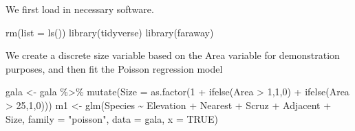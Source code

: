 \documentclass[
  ignorenonframetext,
]{beamer}
\newenvironment{Shaded}{\begin{snugshade}}{\end{snugshade}}
\newcommand{\AttributeTok}[1]{\textcolor[rgb]{0.77,0.63,0.00}{#1}}
\newcommand{\ConstantTok}[1]{\textcolor[rgb]{0.00,0.00,0.00}{#1}}
\newcommand{\DecValTok}[1]{\textcolor[rgb]{0.00,0.00,0.81}{#1}}
\newcommand{\FunctionTok}[1]{\textcolor[rgb]{0.00,0.00,0.00}{#1}}
\newcommand{\NormalTok}[1]{#1}
\newcommand{\OtherTok}[1]{\textcolor[rgb]{0.56,0.35,0.01}{#1}}
\newcommand{\SpecialCharTok}[1]{\textcolor[rgb]{0.00,0.00,0.00}{#1}}
\newcommand{\StringTok}[1]{\textcolor[rgb]{0.31,0.60,0.02}{#1}}
\begin{document}
\begin{frame}[fragile]{}
\protect\hypertarget{section-3}{}
We first load in necessary software.

\vspace{12pt}
\small

\begin{Shaded}
\begin{Highlighting}[]
\FunctionTok{rm}\NormalTok{(}\AttributeTok{list =} \FunctionTok{ls}\NormalTok{())}
\FunctionTok{library}\NormalTok{(tidyverse)}
\FunctionTok{library}\NormalTok{(faraway)}
\end{Highlighting}
\end{Shaded}

\vspace{12pt}

We create a discrete size variable based on the Area variable for
demonstration purposes, and then fit the Poisson regression model

\vspace{12pt}
\footnotesize

\begin{Shaded}
\begin{Highlighting}[]
\NormalTok{gala }\OtherTok{\textless{}{-}}\NormalTok{ gala }\SpecialCharTok{\%\textgreater{}\%} 
  \FunctionTok{mutate}\NormalTok{(}\AttributeTok{Size =} \FunctionTok{as.factor}\NormalTok{(}\DecValTok{1} \SpecialCharTok{+} \FunctionTok{ifelse}\NormalTok{(Area }\SpecialCharTok{\textgreater{}} \DecValTok{1}\NormalTok{,}\DecValTok{1}\NormalTok{,}\DecValTok{0}\NormalTok{) }\SpecialCharTok{+} 
                            \FunctionTok{ifelse}\NormalTok{(Area }\SpecialCharTok{\textgreater{}} \DecValTok{25}\NormalTok{,}\DecValTok{1}\NormalTok{,}\DecValTok{0}\NormalTok{)))}
\NormalTok{m1 }\OtherTok{\textless{}{-}} \FunctionTok{glm}\NormalTok{(Species }\SpecialCharTok{\textasciitilde{}}\NormalTok{ Elevation }\SpecialCharTok{+}\NormalTok{ Nearest }\SpecialCharTok{+}\NormalTok{ Scruz }\SpecialCharTok{+}\NormalTok{ Adjacent }\SpecialCharTok{+}\NormalTok{ Size, }
          \AttributeTok{family =} \StringTok{"poisson"}\NormalTok{, }\AttributeTok{data =}\NormalTok{ gala, }\AttributeTok{x =} \ConstantTok{TRUE}\NormalTok{)}
\end{Highlighting}
\end{Shaded}
\end{frame}
\end{document}
